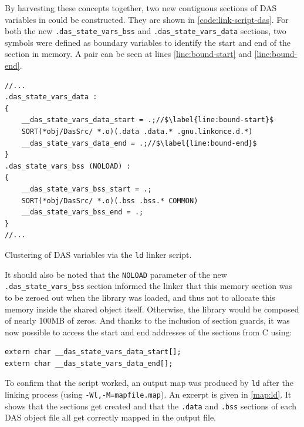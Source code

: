 {By harvesting these concepts together, two new contiguous sections of DAS variables in  could be constructed. They are shown in \autoref{code:link-script-das}. For both the new \texttt{.das_state_vars_bss} and \texttt{.das_state_vars_data} sections, two symbols were defined as boundary variables to identify the start and end of the section in memory. A pair can be seen at lines \ref{line:bound-start} and \ref{line:bound-end}.

\begin{listing}[htbp]
	\vspace{12pt}
	\begin{verbatim}
//...
.das_state_vars_data :
{
	__das_state_vars_data_start = .;//$\label{line:bound-start}$
	SORT(*obj/DasSrc/ *.o)(.data .data.* .gnu.linkonce.d.*)
	__das_state_vars_data_end = .;//$\label{line:bound-end}$
}
.das_state_vars_bss (NOLOAD) :
{
	__das_state_vars_bss_start = .;
	SORT(*obj/DasSrc/ *.o)(.bss .bss.* COMMON)
	__das_state_vars_bss_end = .;
}
//...
	\end{verbatim}
	\caption{Clustering of DAS variables via the \texttt{ld} linker script.}
	\label{code:link-script-das}
\end{listing}

It should also be noted that the \texttt{NOLOAD} parameter of the new \texttt{.das_state_vars_bss} section informed the linker that this memory section was to be zeroed out when the library was loaded, and thus not to allocate this memory inside the shared object itself. Otherwise, the library would be composed of nearly 100MB of zeros. And thanks to the inclusion of section guards, it was now possible to access the start and end addresses of the sections from C using:
\begin{verbatim}
extern char __das_state_vars_data_start[];
extern char __das_state_vars_data_end[];
\end{verbatim}

To confirm that the script worked, an output map was produced by \texttt{ld} after the linking process (using \texttt{-Wl,-M=mapfile.map}). An excerpt is given in \autoref{map:ld}. It shows that the sections get created and that the \texttt{.data} and \texttt{.bss} sections of each DAS object file all get correctly mapped in the output file.

}
